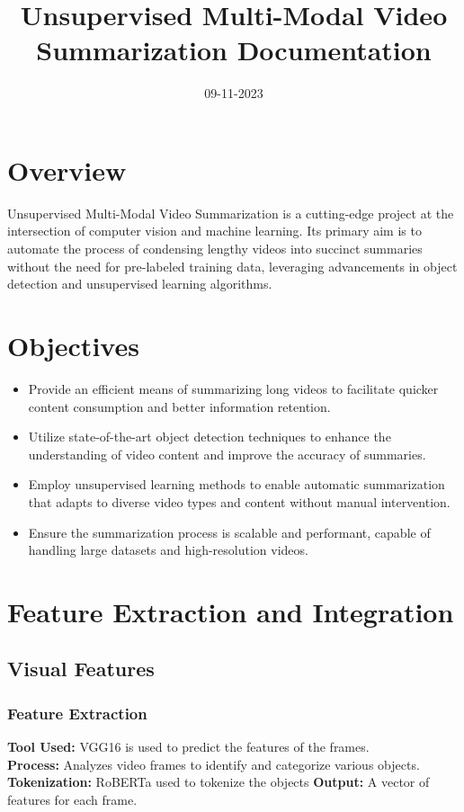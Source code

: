 \documentclass[conference]{IEEEtran}
\title{\Huge Unsupervised Multi-Modal Video Summarization Documentation}
\author{\IEEEauthorblockN{Papagrigoriou Vasileios Savvas}
\IEEEauthorblockA{Auth}}
\date{09-11-2023}
\begin{document}
\maketitle

\section*{Overview}
Unsupervised Multi-Modal Video Summarization is a cutting-edge project at the intersection of computer vision and machine learning. Its primary aim is to automate the process of condensing lengthy videos into succinct summaries without the need for pre-labeled training data, leveraging advancements in object detection and unsupervised learning algorithms.

\section*{Objectives}
\begin{itemize}
    \item Provide an efficient means of summarizing long videos to facilitate quicker content consumption and better information retention.
    \item Utilize state-of-the-art object detection techniques to enhance the understanding of video content and improve the accuracy of summaries.
    \item Employ unsupervised learning methods to enable automatic summarization that adapts to diverse video types and content without manual intervention.
    \item Ensure the summarization process is scalable and performant, capable of handling large datasets and high-resolution videos.
\end{itemize}

\section*{Feature Extraction and Integration}
\subsection*{Visual Features}
\subsubsection*{Feature Extraction}
    \textbf{Tool Used:} VGG16 is used to predict the features of the frames.\\
    \textbf{Process:} Analyzes video frames to identify and categorize various objects.\\ 
    \textbf{Tokenization:} RoBERTa used to tokenize the objects
    \textbf{Output:} A vector of features for each frame.
\\
\end{document}
